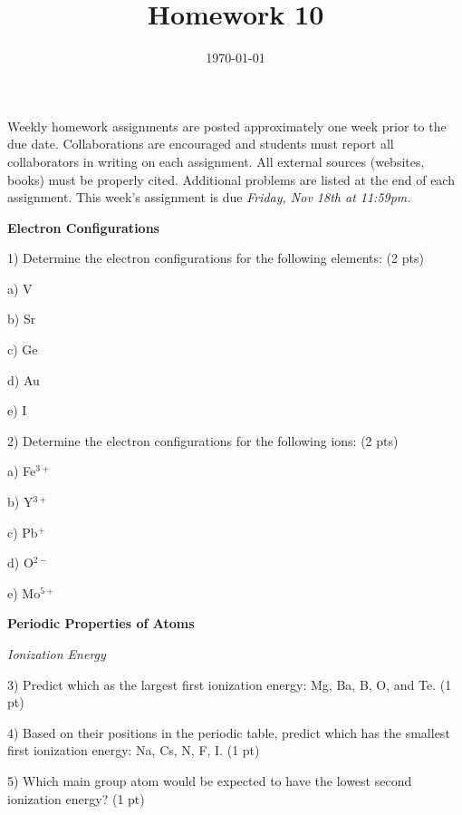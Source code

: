 \documentclass[12pt]{article}
\title{\textbf{Homework 10}}
\date{\vspace{-2em}\today}
\begin{document}
\maketitle 

Weekly homework assignments are posted approximately one week prior to the
due date. Collaborations are encouraged and students must report all collaborators
in writing on each assignment. All external sources (websites, books) must be
properly cited. Additional problems are listed at the end of each assignment.
This week's assignment is due \textit{Friday, Nov 18th at 11:59pm.}

\textbf{Electron Configurations}

1) Determine the electron configurations for the following elements:
(2 pts)

a) V
\vspace{0.2in}

b) Sr
\vspace{0.2in}

c) Ge
\vspace{0.2in}

d) Au
\vspace{0.2in}

e) I
\vspace{0.2in}

2) Determine the electron configurations for the following ions:
(2 pts)

a) Fe$^{3+}$
\vspace{0.2in}

b) Y$^{3+}$
\vspace{0.2in}

c) Pb$^+$
\vspace{0.2in}

d) O$^{2-}$
\vspace{0.2in}

e) Mo$^{5+}$
\vspace{0.4in}

\textbf{Periodic Properties of Atoms}

\textit{Ionization Energy}

3) Predict which as the largest first ionization energy: Mg, Ba, B, O,
and Te. (1 pt)
\vspace{0.4in}

4) Based on their positions in the periodic table, predict which has the
smallest first ionization energy: Na, Cs, N, F, I.  (1 pt)
\vspace{0.4in}

5) Which main group atom would be expected to have the lowest second ionization
energy? (1 pt)
\vspace{0.4in}
\end{document}
